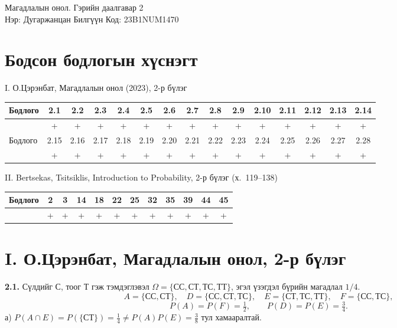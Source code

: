 \documentclass[11pt,a4paper]{article}
\newcommand{\bod}[1]{\par\medskip\noindent\textbf{#1}\quad}
\begin{document}
\begin{center}
  {\Large Магадлалын онол. Гэрийн даалгавар 2}\\[4pt]
  Нэр: Дугаржанцан Билгүүн \qquad Код: 23B1NUM1470
\end{center}

\section*{Бодсон бодлогын хүснэгт}

I. О.Цэрэнбат, Магадлалын онол (2023), 2-р бүлэг

\smallskip
\setlength{\tabcolsep}{4pt}
\begin{tabular}{|l|*{14}{c|}}
\hline
Бодлого & 2.1 & 2.2 & 2.3 & 2.4 & 2.5 & 2.6 & 2.7 & 2.8 & 2.9 & 2.10 & 2.11 & 2.12 & 2.13 & 2.14 \\ \hline
 & + & + & + & + & + & + & + & + & + & + & + & + & + & + \\ \hline
Бодлого & 2.15 & 2.16 & 2.17 & 2.18 & 2.19 & 2.20 & 2.21 & 2.22 & 2.23 & 2.24 & 2.25 & 2.26 & 2.27 & 2.28 \\ \hline
 & + & + & + & + & + & + & + & + & + & + & + & + & + & + \\ \hline
\end{tabular}

\medskip
II. Bertsekas, Tsitsiklis, Introduction to Probability, 2-р бүлэг (х.~119--138)

\smallskip
\begin{tabular}{|l|*{11}{c|}}
\hline
Бодлого & 2 & 3 & 14 & 18 & 22 & 25 & 32 & 35 & 39 & 44 & 45 \\ \hline
 & + & + & + & + & + & + & + & + & + & + & + \\ \hline
\end{tabular}

\section*{I. О.Цэрэнбат, Магадлалын онол, 2-р бүлэг}

\bod{2.1.}
Сүлдийг С, тоог Т гэж тэмдэглэвэл $\Omega=\{\text{СС}, \text{СТ}, \text{ТС}, \text{ТТ}\}$, эгэл үзэгдэл бүрийн магадлал $1/4$.
\[
A=\{\text{СС},\text{СТ}\},\quad D=\{\text{СС},\text{СТ},\text{ТС}\},\quad E=\{\text{СТ},\text{ТС},\text{ТТ}\},\quad F=\{\text{СС},\text{ТС}\},
\]
\[
P(A)=P(F)=\tfrac12,\qquad P(D)=P(E)=\tfrac34 .
\]
а) $P(A\cap E)=P(\{\text{СТ}\})=\frac14\ne P(A)P(E)=\frac38$ тул хамааралтай.
\end{document}

